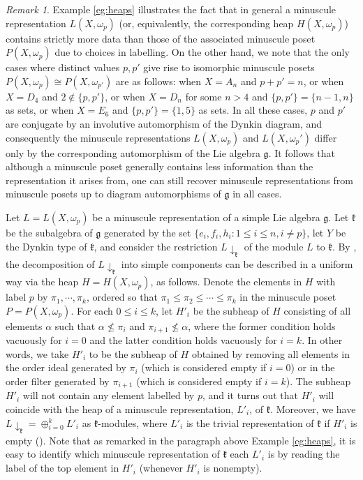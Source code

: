 \documentclass[11pt]{amsart}
\theoremstyle{plain}
\theoremstyle{definition}
\theoremstyle{remark}
\newtheorem{remark}[theorem]{Remark}
\numberwithin{equation}{section}
\newcommand{\fg}{{\mathfrak g}}
\newcommand{\fk}{{\mathfrak k}}
\newcommand{\lxp}{L(X,\omega_p)}
\newcommand{\hxp}{H(X,\omega_p)}
\newcommand{\pxp}{P(X,\omega_p)}
\newcommand{\res}{L\!\downarrow_\fk}
\begin{document}
\begin{remark}
    \label{rmk:automorphism}
Example \ref{eg:heaps} illustrates the fact that in general a minuscule
representation $\lxp$ (or, equivalently, the corresponding heap $\hxp$) contains
strictly more data than those of the associated minuscule poset $\pxp$ due to
choices in labelling. On the other hand, we note that the only cases where
distinct values $p,p'$ give rise to isomorphic minuscule posets
$P(X,\omega_p)\cong P(X,\omega_{p'})$ are as follows: when $X=A_n$ and $p+p'=n$,
or when $X=D_4$ and $2\notin \{p,p'\}$, or when $X=D_n$ for some $n>4$ and
$\{p,p'\}=\{n-1,n\}$ as sets, or when $X=E_6$ and $\{p,p'\}=\{1,5\}$ as sets. In
all these cases, $p$ and $p'$ are conjugate by an involutive automorphism of the
Dynkin diagram, and consequently the minuscule representations $L(X,\omega_p)$
and $L(X,\omega_p')$ differ only by the corresponding automorphism of the Lie
algebra $\fg$. It follows that although a minuscule poset  generally contains
less information than the representation it arises from, one can still recover
minuscule representations from minuscule posets up to diagram automorphisms of
$\fg$ in all cases. \end{remark}

Let $L=\lxp$ be a minuscule representation of a simple Lie algebra $\fg$.  Let
$\fk$ be the subalgebra of $\fg$ generated by the set $\{e_i, f_i, h_i : 1 \leq
i \leq n, i \ne p\}$, let $Y$ be the Dynkin type of $\fk$, and consider the
restriction $L\!\downarrow_\fk$ of the module $L$ to $\fk$. By
\cite[Proposition 8.2.9 (iv)]{green13}, the decomposition of $\res$ into simple
components can be described in a uniform way via the heap $H=\hxp$, as follows.
Denote the elements in $H$ with label $p$ by $\pi_1,\cdots,\pi_k$, ordered so
that $\pi_1\le \pi_2\le \cdots \le \pi_k$ in the minuscule poset $P=\pxp$. For
each $0\le i\le k$, let $H'_i$ be the subheap of $H$ consisting of all
elements $\alpha$ such that $\alpha\not \le \pi_{i}$ and $\pi_{i+1}\not\le
\alpha$, where the former condition holds vacuously for $i=0$ and the latter
condition holds vacuously for $i=k$.  In other words, we take $H'_i$ to be the
subheap of $H$ obtained by removing all elements in the order ideal generated by
$\pi_{i}$ (which is considered empty if $i=0$) or in the order filter generated
by $\pi_{i+1}$ (which is considered empty
if $i=k$). The subheap $H'_i$ will not contain any element labelled by $p$,
and it turns out that $H'_i$ will coincide with the heap of a minuscule
representation, $L'_i$, of $\fk$. Moreover, we have $L\!
\downarrow_\fk=\oplus_{i=0}^{k} L'_i$ as $\fk$-modules, where $L'_i$ is the trivial representation of $\fk$ if
$H'_i$ is empty (\cite[Proposition
8.2.9 (iv)]{green13}). Note that as remarked in the paragraph above Example
\ref{eg:heaps}, it is easy to identify which
minuscule representation of $\fk$ each $L'_i$ is by reading the label of the top
element in $H'_i$ (whenever $H'_i$ is nonempty).
\end{document}
